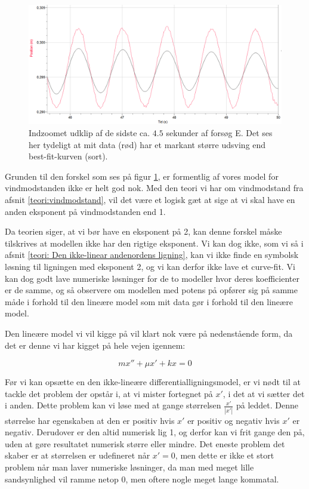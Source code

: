 \begin{figure}[h]
\center
\includegraphics[scale=0.5]{Figurer/Kurvefejl}
\caption{Indzoomet udklip af de sidste ca. $4.5$ sekunder af forsøg E. Det ses her tydeligt  at mit data (rød) har et markant større udsving end best-fit-kurven (sort).}
\label{fig: Fejlkurve exp2}
\end{figure}

Grunden til den forskel som ses på figur \ref{fig: Fejlkurve exp2}, er formentlig af vores model for vindmodstanden ikke er helt god nok. 
Med den teori vi har om vindmodstand fra afsnit \ref{teori:vindmodstand}, vil det være et logisk gæt at sige at vi skal have en anden eksponent på vindmodstanden end 1. 

Da teorien siger, at vi bør have en eksponent på 2, kan denne forskel måske tilskrives at modellen ikke har den rigtige eksponent.
Vi kan dog ikke, som vi så i afsnit \ref{teori: Den ikke-linear andenordens ligning}, kan vi ikke finde en symbolsk løsning til ligningen med eksponent 2, og vi kan derfor ikke lave et curve-fit. 
Vi kan dog godt lave numeriske løsninger for de to modeller hvor deres koefficienter er de samme, og så observere om modellen med potens på opfører sig på samme måde i forhold til den lineære model som mit data gør i forhold til den lineære model.

Den lineære model vi vil kigge på vil klart nok være på nedenstående form, da det er denne vi har kigget på hele vejen igennem:

\begin{equation}
mx'' + \mu x' + kx = 0
\label{eq: standard linear diff}
\end{equation}
 

Før vi kan opsætte en den ikke-lineære differentialligningsmodel, er vi nødt til at tackle det problem der opstår i, at vi mister fortegnet på $x'$, i det at vi sætter det i anden.
Dette problem kan vi løse med at gange størrelsen $\frac{x'}{|x'|}$ på leddet. 
Denne størrelse har egenskaben at den er positiv hvis $x'$ er positiv og negativ hvis $x'$ er negativ. 
Derudover er den altid numerisk lig 1, og derfor kan vi frit gange den på, uden at gøre resultatet numerisk større eller mindre. 
Det eneste problem det skaber er at størrelsen er udefineret når $x'=0$, men dette er ikke et stort problem når man laver numeriske løsninger, da man med meget lille sandsynlighed vil ramme netop 0, men oftere nogle meget lange kommatal. 


